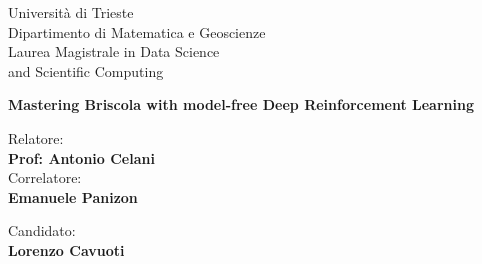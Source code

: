 \begin{titlepage}
    \begin{figure}
        \centering
        
    \end{figure}

    \begin{center}
        \LARGE{Università di Trieste\\}
        \vspace{5mm}
        \LARGE{Dipartimento di Matematica e Geoscienze\\}
        \vspace{5mm}
        \LARGE{Laurea Magistrale in Data Science \\ and Scientific Computing\\}

        \vspace{15mm}
         \huge{\bf Mastering Briscola with model-free Deep Reinforcement Learning}

        \vspace{15mm}

    \end{center}

    \vspace{5mm}

    \begin{minipage}{0.47\textwidth}
        {\large{Relatore:}
            {\normalsize\vspace{3mm} \bf\\ \large{Prof: Antonio Celani}}}
        {\vspace{3mm} \large{\\Correlatore:}
            {\normalsize\vspace{3mm} \bf\\ \large{Emanuele Panizon}}}
    \end{minipage}
    \hfill
    \begin{minipage}{0.47\textwidth}\raggedleft
        {\large{Candidato:}{\normalsize\vspace{3mm} \bf\\ \large{Lorenzo Cavuoti}}}
    \end{minipage}

    \vspace{15mm}
\end{titlepage}